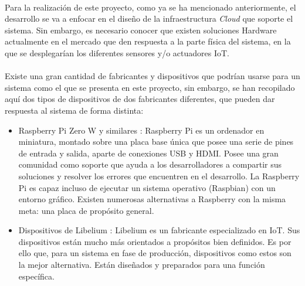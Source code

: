 \documentclass[../../memoria.tex]{subfiles}
\begin{document}
\paragraph{}
Para la realización de este proyecto, como ya se ha mencionado anteriormente, el desarrollo se va a enfocar en el diseño de la infraestructura \textit{Cloud} que soporte el sistema. Sin embargo, es necesario conocer que existen soluciones Hardware actualmente en el mercado que den respuesta a la parte física del sistema, en la que se desplegarían los diferentes sensores y/o actuadores IoT.

\paragraph{}
Existe una gran cantidad de fabricantes y dispositivos que podrían usarse para un sistema como el que se presenta en este proyecto, sin embargo, se han recopilado aquí dos tipos de dispositivos de dos fabricantes diferentes, que pueden dar respuesta al sistema de forma distinta:

\begin{itemize}

    \item Raspberry Pi Zero W y similares \cite{raspberry}: Raspberry Pi es un ordenador en miniatura, montado sobre una placa base única que posee una serie de pines de entrada y salida, aparte de conexiones USB y HDMI. Posee una gran comunidad como soporte que ayuda a los desarrolladores a compartir sus soluciones y resolver los errores que encuentren en el desarrollo. La Raspberry Pi es capaz incluso de ejecutar un sistema operativo (Raspbian) con un entorno gráfico. Existen numerosas alternativas a Raspberry con la misma meta: una placa de propósito general.

    \item Dispositivos de Libelium \cite{libelium}: Libelium es un fabricante especializado en IoT. Sus dispositivos están mucho más orientados a propósitos bien definidos. Es por ello que, para un sistema en fase de producción, dispositivos como estos son la mejor alternativa. Están diseñados y preparados para una función específica.
\end{itemize}
\end{document}
